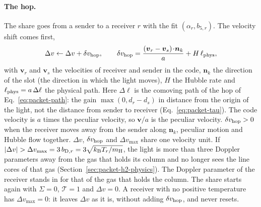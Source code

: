 \paragraph{The hop.} The share goes from a sender to a receiver $r$ with the
fit $(\alpha_r,b_{5,r})$. The velocity shift comes first,
\begin{equation}
  \Delta v \leftarrow \Delta v + \delta v_{\rm hop}, \qquad
  \delta v_{\rm hop} = \frac{(\boldsymbol{v}_r-\boldsymbol{v}_s)\!\cdot\!\boldsymbol{n}_k}{a}
  + H\,\ell_{\rm phys},
  \label{eq:h2-shift}
\end{equation}
with $\boldsymbol{v}_r$ and $\boldsymbol{v}_s$ the velocities of receiver and
sender in the code, $\boldsymbol{n}_k$ the direction of the slot (the direction
in which the light moves), $H$ the Hubble rate and $\ell_{\rm phys}=a\,\Delta\ell$
the physical path. Here $\Delta\ell$ is the comoving path of the hop of
Eq.~\eqref{eq:packet-path}: the gain $\max(0,d_r-d_s)$ in distance from the
origin of the light, not the distance from sender to receiver
(Eq.~\eqref{eq:packet-tau}). The
code velocity is $a$ times the peculiar velocity, so $\boldsymbol v/a$ is the
peculiar velocity. $\delta v_{\rm hop}>0$ when the receiver moves away from the
sender along $\boldsymbol n_k$, peculiar motion and Hubble flow together.
$\Delta v$, $\delta v_{\rm hop}$ and $\Delta v_{\max}$ share one velocity
unit. If $|\Delta v|>\Delta v_{\max}=3\,b_{{\rm D},r}=3\sqrt{k_{\rm B}T_r/m_{\rm H}}$,
the light is more than three Doppler parameters away from the gas that holds its
column and no longer sees the line cores of that gas
(Section~\ref{sec:packet-h2-physics}). The Doppler parameter of the receiver
stands in for that of the gas that holds the column. The share starts again with
$\Sigma=0$, $\mathcal T=1$ and $\Delta v=0$. A receiver with no positive
temperature has $\Delta v_{\max}=0$: it leaves $\Delta v$ as it is, without
adding $\delta v_{\rm hop}$, and never resets.


